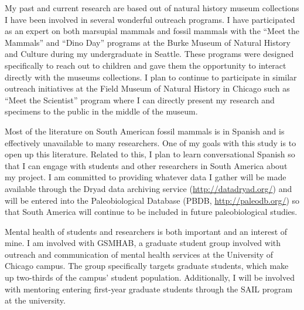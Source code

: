 \documentclass[11pt,letterpaper]{article}
\begin{document}
My past and current research are based out of natural history museum collections I have been involved in several wonderful outreach programs. I have participated as an expert on both marsupial mammals and fossil mammals with the ``Meet the Mammals'' and ``Dino Day'' programs at the Burke Museum of Natural History and Culture during my undergraduate in Seattle. These programs were designed specifically to reach out to children and gave them the opportunity to interact directly with the museums collections. I plan to continue to participate in similar outreach initiatives at the Field Museum of Natural History in Chicago such as ``Meet the Scientist'' program where I can directly present my research and specimens to the public in the middle of the museum.

Most of the literature on South American fossil mammals is in Spanish and is effectively unavailable to many researchers. One of my goals with this study is to open up this literature. Related to this, I plan to learn conversational Spanish so that I can engage with students and other researchers in South America about my project. I am committed to providing whatever data I gather will be made available through the Dryad data archiving service (\url{http://datadryad.org/}) and will be entered into the Paleobiological Database (PBDB, \url{http://paleodb.org/}) so that South America will continue to be included in future paleobiological studies. 

Mental health of students and researchers is both important and an interest of mine. I am involved with GSMHAB, a graduate student group involved with outreach and communication of mental health services at the University of Chicago campus. The group specifically targets graduate students, which make up two-thirds of the campus' student population. Additionally, I will be involved with mentoring entering first-year graduate students through the SAIL program at the university.




\end{document}
